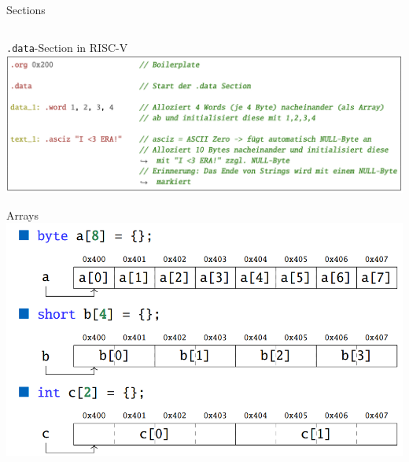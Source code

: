 \documentclass[
  german,            %
  aspectratio=169,    %
]{tumbeamer}
\begin{document}
\begin{frame}[c]{Sections}{}
\begin{columns}[c]
\begin{column}{.3\textwidth}
		\end{column}
	\end{columns}
\end{frame}


\begin{frame}[fragile]{\texttt{.data}-Section in RISC-V}{}
  \includegraphics[width=1.0\linewidth]{data-section.png}
\end{frame}

\begin{frame}[c]{Arrays}{}
  \centering
  \includegraphics[width=0.7\linewidth]{w03_arrays_bjarne.png}
\end{frame}
\end{document}
